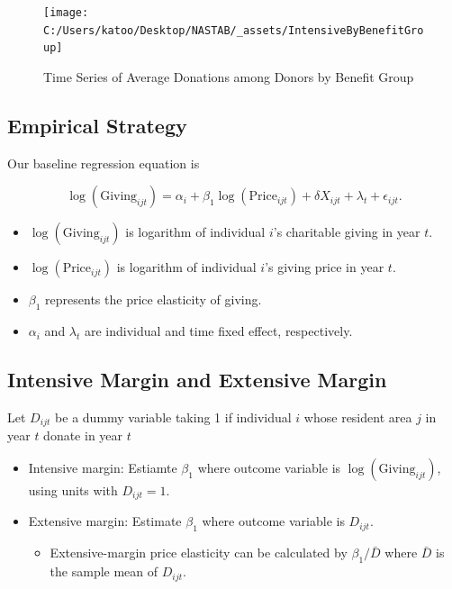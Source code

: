 \documentclass[ review  , 3p ]{elsarticle}
\providecommand{\tightlist}{%
  \setlength{\itemsep}{0pt}\setlength{\parskip}{0pt}}
\begin{document}
  \begin{figure}

  {\centering \texttt{[image: C:/Users/katoo/Desktop/NASTAB/\_assets/IntensiveByBenefitGroup]} 

  }

  \caption{Time Series of Average Donations among Donors by Benefit Group}\label{fig:unnamed-chunk-5}
  \end{figure}

  \hypertarget{empirical-strategy}{%
  \subsection{Empirical Strategy}\label{empirical-strategy}}

  Our baseline regression equation is

  \[
      \log(\text{Giving}_{ijt}) = 
      \alpha_i + \beta_1 \log(\text{Price}_{ijt}) + \delta X_{ijt} + \lambda_t + \epsilon_{ijt}.
  \]

  \begin{itemize}
  \tightlist
  \item
    \(\log(\text{Giving}_{ijt})\) is logarithm of individual \(i\)'s charitable giving in year \(t\).
  \item
    \(\log(\text{Price}_{ijt})\) is logarithm of individual \(i\)'s giving price in year \(t\).
  \item
    \(\beta_1\) represents the price elasticity of giving.
  \item
    \(\alpha_i\) and \(\lambda_t\) are individual and time fixed effect, respectively.
  \end{itemize}

  \hypertarget{intensive-margin-and-extensive-margin}{%
  \subsection{Intensive Margin and Extensive Margin}\label{intensive-margin-and-extensive-margin}}

  Let \(D_{ijt}\) be a dummy variable taking 1 if individual \(i\) whose resident area \(j\) in year \(t\) donate in year \(t\)

  \begin{itemize}
  \tightlist
  \item
    Intensive margin: Estiamte \(\beta_1\) where outcome variable is \(\log(\text{Giving}_{ijt})\), using units with \(D_{ijt} = 1\).
  \item
    Extensive margin: Estimate \(\beta_1\) where outcome variable is \(D_{ijt}\).

    \begin{itemize}
    \tightlist
    \item
      Extensive-margin price elasticity can be calculated by \(\beta_1/\bar{D}\) where \(\bar{D}\) is the sample mean of \(D_{ijt}\).
    \end{itemize}
  \end{itemize}
\end{document}
